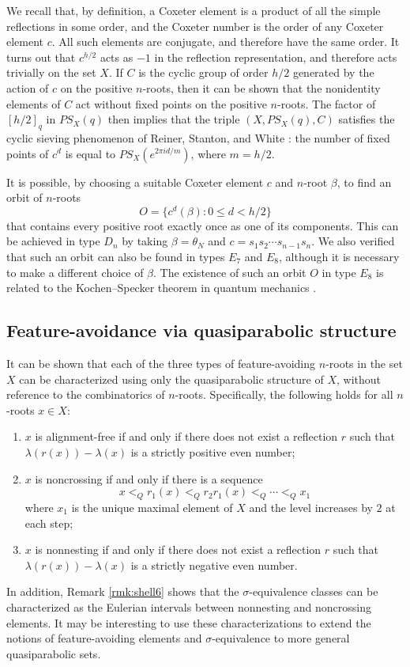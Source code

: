 \documentclass[11pt]{amsart}
\theoremstyle{plain}
\theoremstyle{definition}
\theoremstyle{remark}
\numberwithin{equation}{subsection}
\newcommand{\be}{\beta}
\begin{document}
We recall that, by definition, a Coxeter element is a product of all the simple
reflections in some order, and the Coxeter number is the order of any Coxeter
element $c$. All such elements are conjugate, and therefore have the same order.
It turns out that $c^{h/2}$ acts as $-1$ in the reflection representation, and
therefore acts trivially on the set $X$. If $C$ is the cyclic group of order
$h/2$ generated by the action of $c$ on the positive $n$-roots, then it
can be shown that the nonidentity elements of $C$ act without fixed points on
the positive $n$-roots. The factor of $[h/2]_q$ in $PS_X(q)$ then implies that
the triple $(X, PS_X(q), C)$ satisfies the {cyclic sieving phenomenon} of
Reiner, Stanton, and White \cite{reiner04}: the number of fixed points of $c^d$
is equal to $PS_X(e^{2\pi id/m})$, where $m=h/2$.

It is possible, by choosing a suitable Coxeter element $c$ and $n$-root $\be$,
to find an orbit of $n$-roots $$ O=\{c^d(\be) : 0 \leq d < h/2\} $$ that
contains every positive root exactly once as one of its components. This can be
achieved in type $D_n$ by taking $\be = \theta_N$ and $c = s_1 s_2 \cdots
s_{n-1}s_n$. We also verified that such an orbit can also be found in types
$E_7$ and $E_8$, although it is necessary to make a different choice of $\be$.
The existence of such an orbit $O$ in type $E_8$ is related to the
Kochen--Specker theorem in quantum mechanics \cite{waegell15}.

\subsection{Feature-avoidance via quasiparabolic structure}
\label{sec:abstract_fa}
It can be shown that each of the three types of feature-avoiding $n$-roots in
the set $X$ can be characterized using only the quasiparabolic structure of $X$,
without reference to the combinatorics of $n$-roots.  Specifically, the
following holds for all $n$-roots $x\in X$:
\begin{enumerate}
    \item [{\rm (i)}] $x$ is alignment-free if and only if there does not exist
         a reflection $r$ such that $\lambda(r(x))-\lambda(x)$ is a strictly
         positive even number;
     \item [{\rm (ii)}] $x$ is noncrossing if and only if there is a sequence $$
          x <_Q r_1(x) <_Q r_2r_1(x) <_Q \cdots <_Q x_1 $$ where $x_1$ is the
          unique maximal element of $X$ and the level increases by $2$ at each
          step;
      \item [{\rm (iii)}] $x$ is nonnesting if and only if there does not exist
           a reflection $r$ such that $\lambda(r(x)) - \lambda(x)$ is a strictly
           negative even number.
   \end{enumerate}
In addition, Remark \ref{rmk:shell6} shows that the $\sigma$-equivalence classes
can be characterized as the Eulerian intervals between nonnesting and
noncrossing elements.  It may be interesting to use these characterizations to
extend the notions of feature-avoiding elements and $\sigma$-equivalence to more
general quasiparabolic sets.
\end{document}
